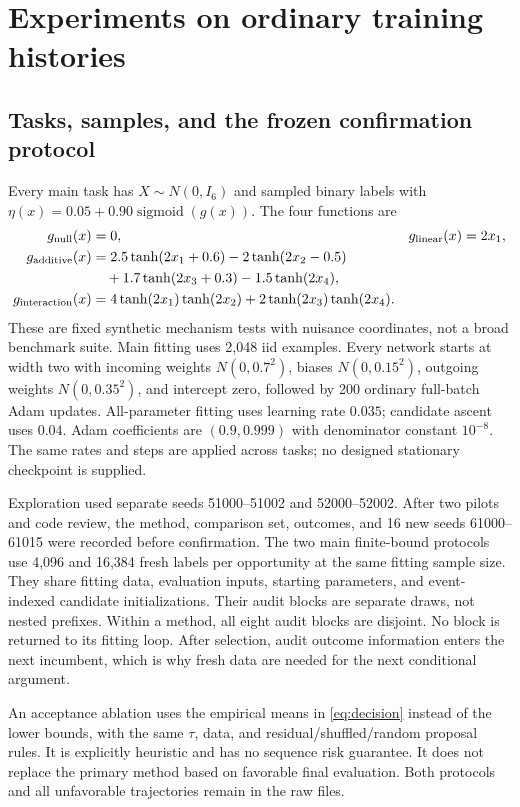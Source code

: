 \documentclass[11pt]{article}
\theoremstyle{remark}\newtheorem{remark}[theorem]{Remark}
\begin{document}
\section{Experiments on ordinary training histories}
\label{sec:experiments}
\subsection{Tasks, samples, and the frozen confirmation protocol}
Every main task has $X\sim N(0,I_6)$ and sampled binary labels with
$\eta(x)=0.05+0.90\operatorname{sigmoid}(g(x))$. The four functions are
\begin{align*}
 g_{\rm null}(x)&=0, &g_{\rm linear}(x)&=2x_1,\\
 g_{\rm additive}(x)&=2.5\tanh(2x_1+0.6)-2\tanh(2x_2-0.5)\\
 &\quad+1.7\tanh(2x_3+0.3)-1.5\tanh(2x_4),\\
 g_{\rm interaction}(x)&=4\tanh(2x_1)\tanh(2x_2)
                 +2\tanh(2x_3)\tanh(2x_4).
\end{align*}
These are fixed synthetic mechanism tests with nuisance coordinates, not a
broad benchmark suite. Main fitting uses 2,048 iid examples. Every network
starts at width two with incoming weights $N(0,0.7^2)$, biases
$N(0,0.15^2)$, outgoing weights $N(0,0.35^2)$, and intercept zero, followed by
200 ordinary full-batch Adam updates. All-parameter fitting uses learning
rate $0.035$; candidate ascent uses $0.04$. Adam coefficients are
$(0.9,0.999)$ with denominator constant $10^{-8}$. The same rates and steps
are applied across tasks; no designed stationary checkpoint is supplied.

Exploration used separate seeds 51000--51002 and 52000--52002. After two
pilots and code review, the method, comparison set, outcomes, and 16 new
seeds 61000--61015 were recorded before confirmation. The two main
finite-bound protocols use 4,096 and 16,384 fresh labels per opportunity at
the same fitting sample size. They share fitting data, evaluation inputs,
starting parameters, and event-indexed candidate initializations. Their
audit blocks are separate draws, not nested prefixes. Within a method,
all eight audit blocks are disjoint. No block is returned to its fitting
loop. After selection, audit outcome information enters the next incumbent,
which is why fresh data are needed for the next conditional argument.

An acceptance ablation uses the empirical means in
\eqref{eq:decision} instead of the lower bounds, with the same $\tau$, data,
and residual/shuffled/random proposal rules. It is explicitly heuristic
and has no sequence risk guarantee. It does not replace the primary method
based on favorable final evaluation. Both protocols and all unfavorable
trajectories remain in the raw files.
\end{document}
